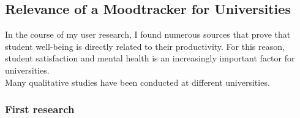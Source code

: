 \documentclass[11pt]{report}
\begin{document}
\subsection{Relevance of a Moodtracker for Universities}

In the course of my user research, I found numerous sources that prove that student well-being is directly related to their productivity. For this reason, student satisfaction and mental health is an increasingly important factor for universities.\\
Many qualitative studies have been conducted at different universities.

\subsubsection{First research}
\end{document}
